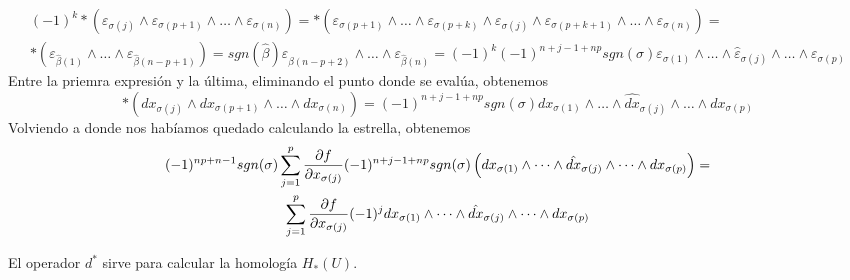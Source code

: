 \documentclass[twoside]{article}
\begin{document}
\begin{solucion}
\begin{gather*}
(-1)^k*(\varepsilon_{\sigma(j)}\land\varepsilon_{\sigma(p+1)}\land\dots\land\varepsilon_{\sigma(n)})=*(\varepsilon_{\sigma(p+1)}\land\dots\land\varepsilon_{\sigma(p+k)}\land\varepsilon_{\sigma(j)}\land\varepsilon_{\sigma(p+k+1)}\land\dots\land\varepsilon_{\sigma(n)})=  \\
*(\varepsilon_{\hat{\beta}(1)}\land\dots\land\varepsilon_{\hat{\beta}(n-p+1)})=sgn(\hat{\beta})\varepsilon_{\hat{\beta}(n-p+2)}\land\dots\land\varepsilon_{\hat{\beta}(n)}=(-1)^k(-1)^{n+j-1+np}sgn(\sigma)\varepsilon_{\sigma(1)}\land\dots\land\hat{\varepsilon}_{\sigma(j)}\land\dots\land\varepsilon_{\sigma(p)}
\end{gather*}
Entre la priemra expresión y la última, eliminando el punto donde se evalúa, obtenemos
\[
*(dx_{\sigma(j)}\land dx_{\sigma(p+1)}\land\dots\land dx_{\sigma(n)})=(-1)^{n+j-1+np}sgn(\sigma) dx_{\sigma(1)}\land\dots\land\hat{dx}_{\sigma(j)}\land\dots\land dx_{\sigma(p)}
\]
Volviendo a donde nos habíamos quedado calculando la estrella, obtenemos
\begin{gather*}
(-1)^{np+n-1}sgn(\sigma)\sum_{j=1}^p\frac{\partial f}{\partial x_{\sigma(j)}}(-1)^{n+j-1+np}sgn(\sigma)\left(dx_{\sigma(1)}\land\dots\land \hat{dx}_{\sigma(j)}\land\dots\land dx_{\sigma(p)}\right)=\\
\sum_{j=1}^p\frac{\partial f}{\partial x_{\sigma(j)}}(-1)^{j}dx_{\sigma(1)}\land\dots\land \hat{dx}_{\sigma(j)}\land\dots\land dx_{\sigma(p)}
\end{gather*}

\begin{nota}
El operador $d^*$ sirve para calcular la homología $H_*(U)$. 
\end{nota}
\end{solucion}
\newpage
\end{document}

